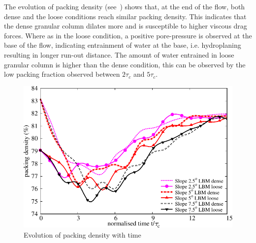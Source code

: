 The evolution of packing density (see~) shows that, at the end 
of the flow, both dense and the loose conditions reach similar packing density. 
This indicates that the dense granular column dilates more and is susceptible 
to higher viscous drag forces. Where as in the loose condition, a positive 
pore-pressure is observed at the base of the flow, indicating entrainment of 
water at the base, i.e. hydroplaning resulting in longer run-out distance. The 
amount of water entrained in loose granular column is higher than the dense 
condition, this can be observed by the low packing fraction observed between 
$2\tau_c$ and $5 \tau_c$. 

\begin{figure}
\centering
\includegraphics[width=0.97\columnwidth]{Voronoi_Slope_Dense_Loose}
\caption{Evolution of packing density with time}
\label{fig:voro}
\end{figure}

